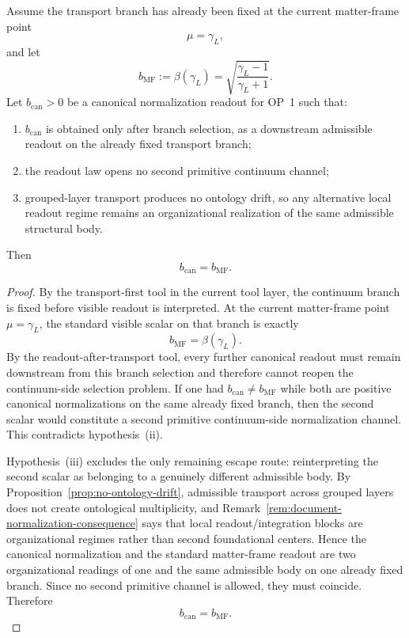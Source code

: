 \begin{theorem}
\label{thm:working-op1-admissible-readout-uniqueness}
Assume the transport branch has already been fixed at the current matter-frame point
\[
 \mu=\gamma_L,
\]
and let
\[
 b_{\mathrm{MF}}:=\beta(\gamma_L)=\sqrt{\frac{\gamma_L-1}{\gamma_L+1}}.
\]
Let \(b_{\mathrm{can}}>0\) be a canonical normalization readout for OP~1 such that:
\begin{enumerate}[label=(\roman*), leftmargin=2em]
 \item \(b_{\mathrm{can}}\) is obtained only after branch selection, as a downstream admissible readout on the already fixed transport branch;
 \item the readout law opens no second primitive continuum channel;
 \item grouped-layer transport produces no ontology drift, so any alternative local readout regime remains an organizational realization of the same admissible structural body.
\end{enumerate}
Then
\[
 b_{\mathrm{can}}=b_{\mathrm{MF}}.
\]
\end{theorem}

\begin{proof}
By the transport-first tool in the current tool layer, the continuum branch is fixed before visible readout is interpreted. At the current matter-frame point \(\mu=\gamma_L\), the standard visible scalar on that branch is exactly
\[
 b_{\mathrm{MF}}=\beta(\gamma_L).
\]
By the readout-after-transport tool, every further canonical readout must remain downstream from this branch selection and therefore cannot reopen the continuum-side selection problem. If one had \(b_{\mathrm{can}}\neq b_{\mathrm{MF}}\) while both are positive canonical normalizations on the same already fixed branch, then the second scalar would constitute a second primitive continuum-side normalization channel. This contradicts hypothesis~(ii).

Hypothesis~(iii) excludes the only remaining escape route: reinterpreting the second scalar as belonging to a genuinely different admissible body. By Proposition~\ref{prop:no-ontology-drift}, admissible transport across grouped layers does not create ontological multiplicity, and Remark~\ref{rem:document-normalization-consequence} says that local readout/integration blocks are organizational regimes rather than second foundational centers. Hence the canonical normalization and the standard matter-frame readout are two organizational readings of one and the same admissible body on one already fixed branch. Since no second primitive channel is allowed, they must coincide. Therefore
\[
 b_{\mathrm{can}}=b_{\mathrm{MF}}.
\]
\end{proof}

